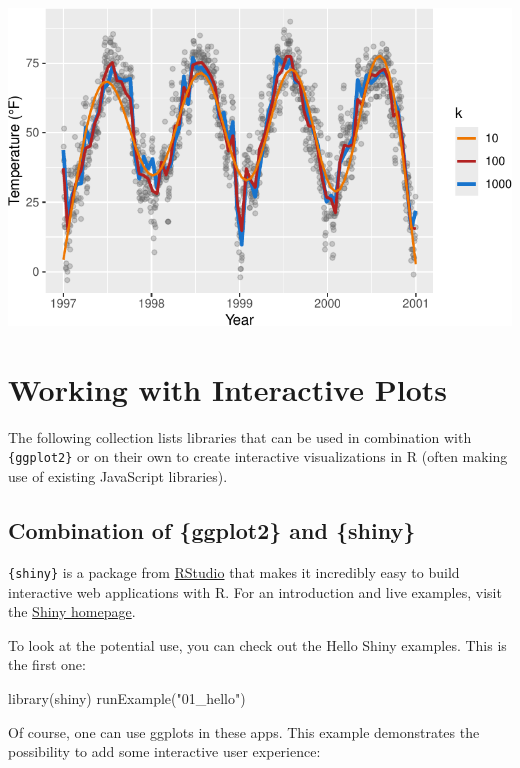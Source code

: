 \documentclass[
  letterpaper,
]{scrbook}
\newenvironment{Shaded}{\begin{snugshade}}{\end{snugshade}}
\newcommand{\FunctionTok}[1]{\textcolor[rgb]{0.28,0.35,0.67}{#1}}
\newcommand{\NormalTok}[1]{\textcolor[rgb]{0.00,0.23,0.31}{#1}}
\newcommand{\StringTok}[1]{\textcolor[rgb]{0.13,0.47,0.30}{#1}}
\begin{document}
\includegraphics{ch17_files/figure-pdf/GAM-spec2-1.pdf}


\chapter{Working with Interactive Plots}\label{interactive}

The following collection lists libraries that can be used in combination
with \texttt{\{ggplot2\}} or on their own to create interactive
visualizations in R (often making use of existing JavaScript libraries).

\section{Combination of \{ggplot2\} and
\{shiny\}}\label{combination-of-ggplot2-and-shiny}

\texttt{\{shiny\}} is a package from
\href{https://rstudio.com/}{RStudio} that makes it incredibly easy to
build interactive web applications with R. For an introduction and live
examples, visit the \href{http://shiny.rstudio.com/}{Shiny homepage}.

To look at the potential use, you can check out the Hello Shiny
examples. This is the first one:

\begin{Shaded}
\begin{Highlighting}[]
\FunctionTok{library}\NormalTok{(shiny)}
\FunctionTok{runExample}\NormalTok{(}\StringTok{"01\_hello"}\NormalTok{)}
\end{Highlighting}
\end{Shaded}

Of course, one can use ggplots in these apps. This example demonstrates
the possibility to add some interactive user experience:
\end{document}
